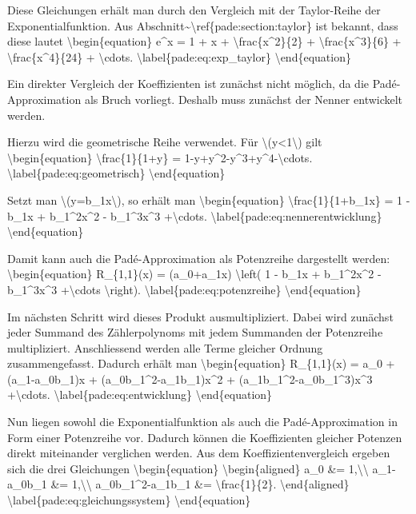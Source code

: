 Diese Gleichungen erhält man durch den Vergleich mit der Taylor-Reihe
der Exponentialfunktion. Aus
Abschnitt\textasciitilde\textbackslash ref\{pade:section:taylor\} ist
bekannt, dass diese lautet \textbackslash begin\{equation\} e\^{}x = 1 +
x + \textbackslash frac\{x\^{}2\}\{2\} +
\textbackslash frac\{x\^{}3\}\{6\} + \textbackslash frac\{x\^{}4\}\{24\}
+ \textbackslash cdots. \textbackslash label\{pade:eq:exp\_taylor\}
\textbackslash end\{equation\}

Ein direkter Vergleich der Koeffizienten ist zunächst nicht möglich, da
die Padé-Approximation als Bruch vorliegt. Deshalb muss zunächst der
Nenner entwickelt werden.

Hierzu wird die geometrische Reihe verwendet. Für
\textbackslash(\textbar y\textbar\textless1\textbackslash) gilt
\textbackslash begin\{equation\} \textbackslash frac\{1\}\{1+y\} =
1-y+y\^{}2-y\^{}3+y\^{}4-\textbackslash cdots.
\textbackslash label\{pade:eq:geometrisch\}
\textbackslash end\{equation\}

Setzt man \textbackslash(y=b\_1x\textbackslash), so erhält man
\textbackslash begin\{equation\} \textbackslash frac\{1\}\{1+b\_1x\} = 1
- b\_1x + b\_1\^{}2x\^{}2 - b\_1\^{}3x\^{}3 +\textbackslash cdots.
\textbackslash label\{pade:eq:nennerentwicklung\}
\textbackslash end\{equation\}

Damit kann auch die Padé-Approximation als Potenzreihe dargestellt
werden: \textbackslash begin\{equation\} R\_\{1,1\}(x) = (a\_0+a\_1x)
\textbackslash left( 1 - b\_1x + b\_1\^{}2x\^{}2 - b\_1\^{}3x\^{}3
+\textbackslash cdots \textbackslash right).
\textbackslash label\{pade:eq:potenzreihe\}
\textbackslash end\{equation\}

Im nächsten Schritt wird dieses Produkt ausmultipliziert. Dabei wird
zunächst jeder Summand des Zählerpolynoms mit jedem Summanden der
Potenzreihe multipliziert. Anschliessend werden alle Terme gleicher
Ordnung zusammengefasst. Dadurch erhält man
\textbackslash begin\{equation\} R\_\{1,1\}(x) = a\_0 + (a\_1-a\_0b\_1)x
+ (a\_0b\_1\^{}2-a\_1b\_1)x\^{}2 + (a\_1b\_1\^{}2-a\_0b\_1\^{}3)x\^{}3
+\textbackslash cdots. \textbackslash label\{pade:eq:entwicklung\}
\textbackslash end\{equation\}

Nun liegen sowohl die Exponentialfunktion als auch die
Padé-Approximation in Form einer Potenzreihe vor. Dadurch können die
Koeffizienten gleicher Potenzen direkt miteinander verglichen werden.
Aus dem Koeffizientenvergleich ergeben sich die drei Gleichungen
\textbackslash begin\{equation\} \textbackslash begin\{aligned\} a\_0
\&= 1,\textbackslash\textbackslash{} a\_1-a\_0b\_1 \&=
1,\textbackslash\textbackslash{} a\_0b\_1\^{}2-a\_1b\_1 \&=
\textbackslash frac\{1\}\{2\}. \textbackslash end\{aligned\}
\textbackslash label\{pade:eq:gleichungssystem\}
\textbackslash end\{equation\}

